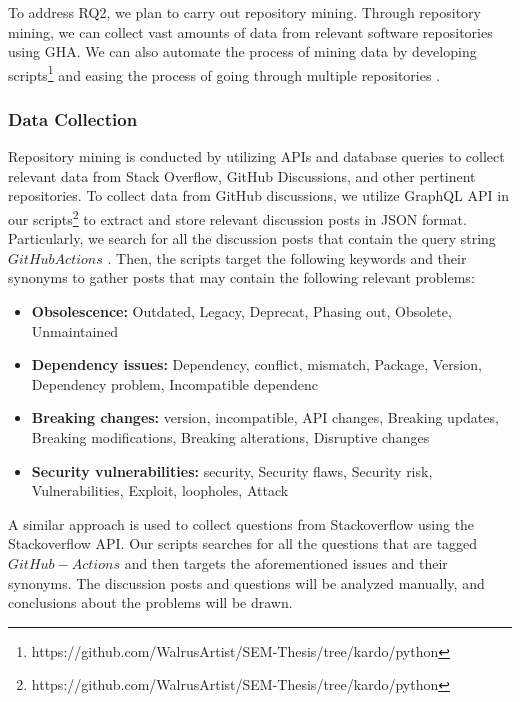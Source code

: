 \documentclass[conference]{IEEEtran}
\begin{document}
       To address RQ2, we plan to carry out repository mining. Through repository mining, we can collect vast amounts of data from relevant software repositories using GHA. We can also automate the process of mining data by developing scripts\footnote{https://github.com/WalrusArtist/SEM-Thesis/tree/kardo/python}  and easing the process of going through multiple repositories \cite{chaturvedi2013tools}.\\

        \subsubsection{\textbf{Data Collection}}
            Repository mining is conducted by utilizing APIs and database queries to collect relevant data from Stack Overflow, GitHub Discussions, and other pertinent repositories. To collect data from GitHub discussions, we utilize GraphQL API  in our scripts\footnote{https://github.com/WalrusArtist/SEM-Thesis/tree/kardo/python} to extract and store relevant discussion posts in JSON format. Particularly, we search for all the discussion posts that contain the query string $GitHub Actions$ . Then, the scripts target the following keywords and their synonyms to gather posts that may contain the following relevant problems: \\
\begin{itemize}
	\item \textbf{Obsolescence:} Outdated, Legacy, Deprecat, Phasing out, Obsolete, Unmaintained
	\item \textbf{Dependency issues:} Dependency, conflict, mismatch, Package, Version, Dependency problem, Incompatible dependenc
	\item	\textbf{Breaking changes:} version, incompatible, API changes, Breaking updates, Breaking modifications, Breaking alterations, Disruptive changes
          \item \textbf{Security vulnerabilities:} security, Security flaws, Security risk, Vulnerabilities, Exploit, loopholes, Attack\\
\end{itemize}
	A similar approach is used to collect questions from Stackoverflow using the Stackoverflow API. Our scripts searches for all the questions that are tagged $GitHub-Actions$ and then targets the aforementioned issues and their synonyms. The discussion posts and questions will be analyzed manually, and conclusions about the problems will be drawn.\\
\end{document}
